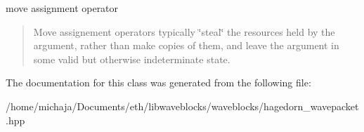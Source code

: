move assignment operator 

\begin{quote}
Move assignement operators typically \char`\"{}steal\char`\"{} the resources held by the argument, rather than make copies of them, and leave the argument in some valid but otherwise indeterminate state. \end{quote}


The documentation for this class was generated from the following file\+:\begin{DoxyCompactItemize}
\item 
/home/michaja/\+Documents/eth/libwaveblocks/waveblocks/hagedorn\+\_\+wavepacket.\+hpp\end{DoxyCompactItemize}
